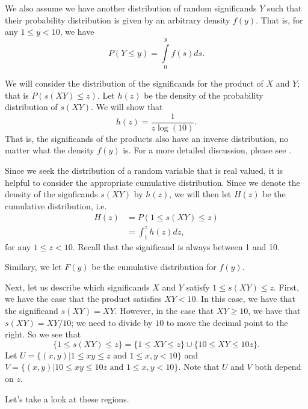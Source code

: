 We also assume we have another distribution of random significands \(Y\) such that their probability distribution is given by an 
arbitrary density \(f(y)\). That is, for any \(1 \leq y < 10\), we have 
\begin{equation}
P\left(Y \leq y\right) = \int \limits_0^y f(s) ds.
\end{equation}

We will consider the distribution of the significands for the product of \(X\) and \(Y\); that is \(P(s(XY) \leq z)\). Let \(h(z)\) be the density of the probability
distribution of \(s(XY)\). We will show that
\begin{equation}
h(z) = \frac{1}{z\log(10)}.
\end{equation}
That is, the significands of the products also have an inverse distribution, no matter what the density \(f(y)\) is. For a more detailed discussion, please see \cite{Hamming}.

Since we seek the distribution of a random variable that is real valued, it is helpful to consider the appropriate cumulative distribution. Since we denote the density of 
the signficands \(s(XY)\) by \(h(z)\), we will then let \(H(z)\) be the cumulative distribution, i.e. 
\begin{align}
H(z) & = P(1 \leq s(XY) \leq z) \\
    & = \int_1^z h(z) dz,
\end{align}
for any \(1 \leq z < 10\). Recall that the significand is always between 1 and 10.

Similary, we let \(F(y)\) be the cumulative distribution for \(f(y)\).

Next, let us describe which significands \(X\) and \(Y\) satisfy \(1 \leq s(XY) \leq z\). First, we have the case that the product satisfies \(XY < 10\). In this case, we have that
the significand \(s(XY) = XY\). However, in the case that \(XY \geq 10\), we have that \(s(XY) = XY / 10\); we need to divide by \(10\) to move the decimal point to the right. So we
see that
\begin{equation}
\{1 \leq s(XY) \leq z\} = \{1 \leq XY \leq z\} \cup \{10 \leq XY \leq 10z\}.
\end{equation}
Let \(U = \{(x, y) | 1 \leq xy \leq z \text{ and } 1\leq x,y < 10\}\) 
and \(V = \{(x, y) | 10 \leq xy \leq 10z \text{ and } 1\leq x, y < 10\}\). Note that \(U\) and \(V\) both depend on \(z\).

Let's take a look at these regions.

